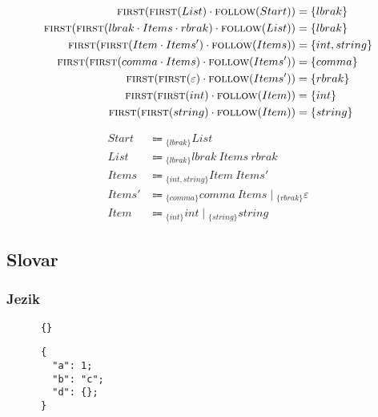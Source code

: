 \documentclass{report}
\newcommand{\Null}{\varepsilon}
\newcommand{\Seq}{\cdot}
\newcommand{\Spc}{\ }
\newcommand{\Union}{\mathrel{|}}
\newcommand{\FIRST}{\textsc{first}}
\newcommand{\FOLLOW}{\textsc{follow}}
\newcommand{\Arrow}{\Coloneq}
\newcommand{\NT}[1]{{#1}}
\newcommand{\T}[1]{{#1}}
\newcommand{\Lookahead}[1]{{}_{\{{#1}\}}}
\begin{document}
    \begin{equation*}
      \begin{aligned}
        \FIRST(\FIRST(\T{List}) \Seq \FOLLOW(\NT{Start})) &= \{\T{lbrak}\}\\
        \FIRST(\FIRST(\T{lbrak} \Seq \NT{Items} \Seq \T{rbrak}) \Seq \FOLLOW(\NT{List})) &= \{\T{lbrak}\}\\
        \FIRST(\FIRST(\NT{Item} \Seq \NT{Items'}) \Seq \FOLLOW(\NT{Items})) &= \{\T{int, string}\}\\
        \FIRST(\FIRST(\T{comma} \Seq \NT{Items}) \Seq \FOLLOW(\NT{Items'})) &= \{\T{comma}\}\\
        \FIRST(\FIRST(\Null) \Seq \FOLLOW(\NT{Items'})) &= \{\T{rbrak}\}\\
        \FIRST(\FIRST(\T{int}) \Seq \FOLLOW(\NT{Item})) &= \{\T{int}\}\\
        \FIRST(\FIRST(\T{string}) \Seq \FOLLOW(\NT{Item})) &= \{\T{string}\}\\
      \end{aligned}
    \end{equation*}

    \begin{equation*}
      \begin{aligned}
        \NT{Start} &\Arrow \Lookahead{\T{lbrak}} \NT{List}\\
        \NT{List} &\Arrow \Lookahead{\T{lbrak}} \T{lbrak} \Spc \NT{Items} \Spc \T{rbrak}\\
        \NT{Items} &\Arrow \Lookahead{\T{int}, \T{string}} \NT{Item} \Spc \NT{Items'}\\
        \NT{Items'} &\Arrow \Lookahead{\T{comma}} \T{comma} \Spc \NT{Items} \Union \Lookahead{\T{rbrak}} \Null\\
        \NT{Item} &\Arrow \Lookahead{\T{int}} \T{int} \Union \Lookahead{\T{string}} \T{string}
      \end{aligned}
    \end{equation*}

    \subsection{Slovar}

    \subsubsection*{Jezik}
    \begin{verbatim}
      {}
    \end{verbatim}
    \begin{verbatim}
      {
        "a": 1;
        "b": "c";
        "d": {};
      }
    \end{verbatim}
\end{document}
